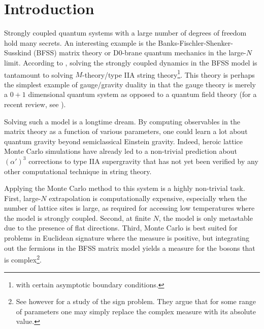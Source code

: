 \documentclass[11pt]{article}
\begin{document}
\newpage

\setcounter{tocdepth}{3}






\tableofcontents
\renewcommand*{\thefootnote}{\arabic{footnote}}
\setcounter{footnote}{0}
\section{Introduction}

Strongly coupled quantum systems with a large number of degrees of freedom hold many secrets. An interesting example is the Banks-Fischler-Shenker-Susskind (BFSS) matrix theory \cite{deWit:1988wri, Banks:1996vh} or D0-brane quantum mechanics in the large-$N$ limit. According to \cite{Banks:1996vh, Itzhaki:1998dd}, solving the strongly coupled dynamics in the BFSS model is tantamount to solving $M$-theory/type IIA string theory\footnote{with certain asymptotic boundary conditions.}. This theory is perhaps the simplest example of gauge/gravity duality in that the gauge theory is merely a $0+1$ dimensional quantum system as opposed to a quantum field theory (for a recent review, see \cite{Maldacena:2023acv}).



Solving such a model is a longtime dream. By computing observables in the matrix theory as a function of various parameters, one could learn a lot about quantum gravity beyond semiclassical Einstein gravity. Indeed, heroic lattice Monte Carlo simulations \cite{Kabat:2000zv, Anagnostopoulos:2007fw, Hanada:2008ez, Catterall:2008yz, Filev:2015hia, Kadoh:2015mka, Berkowitz:2016jlq, Berkowitz:2018qhn, Pateloudis:2022ijr} have already led to a non-trivial prediction about $(\alpha')^3$ corrections to type IIA supergravity that has not yet been verified by any other computational technique in string theory.


Applying the Monte Carlo method to this system is a highly non-trivial task. First, large-$N$ extrapolation is computationally expensive, especially when the number of lattice sites is large, as required for accessing low temperatures where the model is strongly coupled. Second, at finite $N$, the model is only metastable due to the presence of flat directions. 
Third, Monte Carlo is best suited for problems in Euclidean signature where the measure is positive, but integrating out the fermions in the BFSS matrix model yields a measure for the bosons that is complex\footnote{See however \cite{Catterall:2008yz, Catterall:2009xn, Berkowitz:2016jlq} for a study of the sign problem. They argue that for some range of parameters one may simply replace the complex measure with its absolute value.}.
\end{document}
